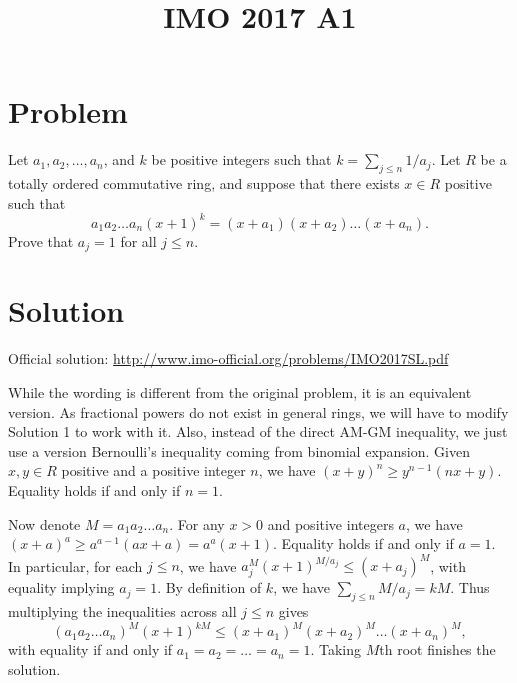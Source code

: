 \documentclass{article}
\title{IMO 2017 A1}
\author{}
\date{}
\begin{document}
\maketitle



\section*{Problem}

Let $a_1, a_2, \ldots, a_n$, and $k$ be positive integers such that $k = \sum_{j \leq n} 1/a_j$.
Let $R$ be a totally ordered commutative ring, and suppose that there exists $x \in R$ positive such that
\[ a_1 a_2 \ldots a_n (x + 1)^k = (x + a_1) (x + a_2) \ldots (x + a_n). \]
Prove that $a_j = 1$ for all $j \leq n$.



\section*{Solution}

Official solution: \url{http://www.imo-official.org/problems/IMO2017SL.pdf}

While the wording is different from the original problem, it is an equivalent version.
As fractional powers do not exist in general rings, we will have to modify Solution 1 to work with it.
Also, instead of the direct AM-GM inequality, we just use a version Bernoulli's inequality coming from binomial expansion.
Given $x, y \in R$ positive and a positive integer $n$, we have $(x + y)^n \geq y^{n - 1} (nx + y)$.
Equality holds if and only if $n = 1$.

Now denote $M = a_1 a_2 \ldots a_n$.
For any $x > 0$ and positive integers $a$, we have $(x + a)^a \geq a^{a - 1} (ax + a) = a^a (x + 1)$.
Equality holds if and only if $a = 1$.
In particular, for each $j \leq n$, we have $a_j^M (x + 1)^{M/a_j} \leq (x + a_j)^M$, with equality implying $a_j = 1$.
By definition of $k$, we have $\sum_{j \leq n} M/a_j = kM$.
Thus multiplying the inequalities across all $j \leq n$ gives
\[ (a_1 a_2 \ldots a_n)^M (x + 1)^{kM} \leq (x + a_1)^M (x + a_2)^M \ldots (x + a_n)^M, \]
    with equality if and only if $a_1 = a_2 = \ldots = a_n = 1$.
Taking $M$th root finishes the solution.
\end{document}
